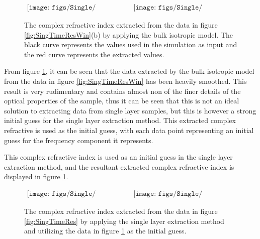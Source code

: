 \begin{figure}[H]
                \begin{center}$
								\begin{array}{cc}
                \texttt{[image: figs/Single/n\_window.png]}&
                \texttt{[image: figs/Single/k\_window.png]}
								\end{array}$
								\end{center}
	\caption[Extracted complex refractive index for single layer isotropic sample with Hann window and bulk isotropic model]{The complex refractive index extracted from the data in figure \ref{fig:SingTimeResWin}(b) by applying the bulk isotropic model. The black curve represents the values used in the simulation as input and the red curve represents the extracted values.}
	\label{fig:SingExt_HannBulk}
\end{figure}

From figure \ref{fig:SingExt_HannBulk}, it can be seen that the data extracted by the bulk isotropic model from the data in figure \ref{fig:SingTimeResWin} has been heavily smoothed. This result is very rudimentary and contains almost non of the finer details of the optical properties of the sample, thus it can be seen that this is not an ideal solution to extracting data from single layer samples, but this is however a strong initial guess for the single layer extraction method. This extracted complex refractive is used as the initial guess, with each data point representing an initial guess for the frequency component it represents.

This complex refractive index is used as an initial guess in the single layer extraction method, and the resultant extracted complex refractive index is displayed in figure \ref{fig:SingExt_HannBulk}.

\begin{figure}[H]
                \begin{center}$
								\begin{array}{cc}
                \texttt{[image: figs/Single/n\_window\_single2.png]}&
                \texttt{[image: figs/Single/k\_window\_single2.png]}
								\end{array}$
								\end{center}
	\caption[Extracted complex refractive index for single layer isotropic sample with Hann window as initial guess]{The complex refractive index extracted from the data in figure \ref{fig:SingTimeRes} by applying the single layer extraction method
	and utilizing the data in figure \ref{fig:SingExt_HannBulk} as the initial guess.}
	\label{fig:SingExt_HannSingle}
\end{figure}

